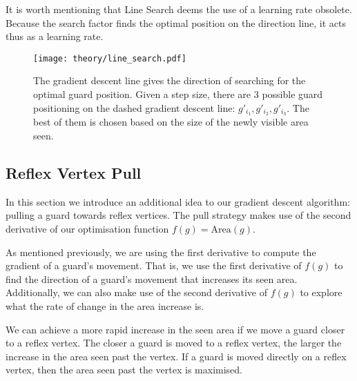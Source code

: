 It is worth mentioning that Line Search deems the use of a learning rate obsolete. Because the search factor finds the optimal position on the direction line, it acts thus as a learning rate.

\begin{figure}[h!]
    \centering
    \texttt{[image: theory/line\_search.pdf]}
    \caption{The gradient descent line gives the direction of searching for the optimal guard position. Given a step size, there are 3 possible guard positioning on the dashed gradient descent line: $g'_{i_1}, g'_{i_2}, g'_{i_3}$. The best of them is chosen based on the size of the newly visible area seen.}
    \label{fig:line}
\end{figure}

\subsection{Reflex Vertex Pull}

In this section we introduce an additional idea to our gradient descent algorithm: pulling a guard towards reflex vertices. The pull strategy makes use of the second derivative of our optimisation function $f(g) = \text{Area}(g)$.



As mentioned previously, we are using the first derivative to compute the gradient of a guard's movement. That is, we use the first derivative of $f(g)$ to find the direction of a guard's movement that increases its seen area. Additionally, we can also make use of the second derivative of $f(g)$ to explore what the rate of change in the area increase is. 

We can achieve a more rapid increase in the seen area if we move a guard closer to a reflex vertex. The closer a guard is moved to a reflex vertex, the larger the increase in the area seen past the vertex. If a guard is moved directly on a reflex vertex, then the area seen past the vertex is maximised. 



